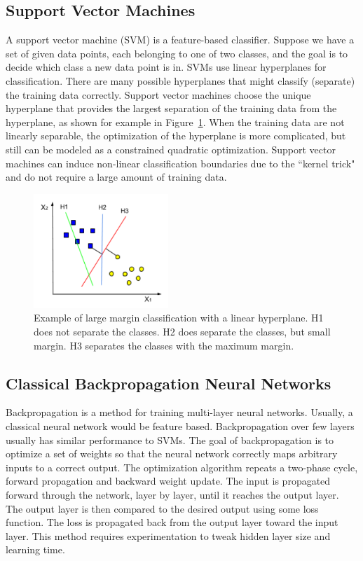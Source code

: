 \subsection{Support Vector Machines}
A support vector machine (SVM) is a feature-based classifier. Suppose we have a set of given data points, each belonging to one of two classes, and the goal is to decide which class a new data point is in. SVMs use linear hyperplanes for classification. There are many possible hyperplanes that might classify (separate) the training data correctly. Support vector machines choose the unique hyperplane that provides the largest separation of the training data from the hyperplane, as shown for example in Figure~\ref{fig:svm}. When the training data are not linearly separable, the optimization of the hyperplane is more complicated, but still can be modeled as a constrained quadratic optimization. Support vector machines can induce non-linear classification boundaries due to the \textquotedblleft kernel trick" and do not require a large amount of training data.

\begin{figure}[t]
  \centering
  \includegraphics[width=2in]{figures/svm.jpg}   
  \caption[svm]{Example of large margin classification with a linear hyperplane. H1 does not separate the classes. H2 does separate the classes, but small margin. H3 separates the classes with the maximum margin. }
  \label{fig:svm}
\end{figure}


\subsection{Classical Backpropagation Neural Networks}
Backpropagation is a method for training multi-layer neural networks. Usually, a classical neural network would be feature based. Backpropagation over few layers usually has  similar performance to SVMs. The goal of backpropagation is to optimize a set of weights so that the neural network correctly maps arbitrary inputs to a correct output. The optimization algorithm repeats a two-phase cycle, forward propagation and backward weight update. The input is propagated forward through the network, layer by layer, until it reaches the output layer. The output layer is then compared to the desired output using some loss function. The loss is propagated back from the output layer toward the input layer. This method requires  experimentation to tweak hidden layer size and learning time.


